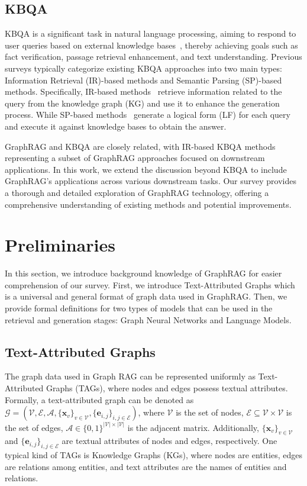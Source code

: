 \documentclass[acmsmall]{acmart}
\begin{document}
\subsection{KBQA}
KBQA is a significant task in natural language processing, aiming to respond to user queries based on external knowledge bases~\cite{ref:kbqasurvey1,ref:kbqasurvey2,ref:kbqasurvey3,ref:kbqasurvey4}, thereby achieving goals such as fact verification, passage retrieval enhancement, and text understanding. Previous surveys typically categorize existing KBQA approaches into two main types: Information Retrieval (IR)-based methods and Semantic Parsing (SP)-based methods. Specifically, IR-based methods~\cite{ref:rog,ref:tog,ref:tog2,ref:unikgqa,ref:sr,ref:rra,ref:kd-cot,ref:kg-agent} retrieve information related to the query from the knowledge graph (KG) and use it to enhance the generation process. While SP-based methods~\cite{ref:noname3,ref:dara,ref:retrack,ref:rng,ref:arcaneqa,ref:hsge} generate a logical form (LF) for each query and execute it against knowledge bases to obtain the answer.

GraphRAG and KBQA are closely related, with IR-based KBQA methods representing a subset of GraphRAG approaches focused on downstream applications. In this work, we extend the discussion beyond KBQA to include GraphRAG’s applications across various downstream tasks. Our survey provides a thorough and detailed exploration of GraphRAG technology, offering a comprehensive understanding of existing methods and potential improvements.

\section{Preliminaries}
\label{sec:formalization}
In this section, we introduce background knowledge of GraphRAG for easier comprehension of our survey. First, we introduce Text-Attributed Graphs which is a universal and general format of graph data used in GraphRAG. Then, we provide formal definitions for two types of models that can be used in the retrieval and generation stages: Graph Neural Networks and Language Models.

\subsection{Text-Attributed Graphs}
The graph data used in Graph RAG can be represented uniformly as Text-Attributed Graphs (TAGs), where nodes and edges possess textual attributes. Formally, a text-attributed graph can be denoted as $\mathcal{G} = (\mathcal{V}, \mathcal{E}, \mathcal{A}, \{\mathbf{x}_v\}_{v \in \mathcal{V}},\{\mathbf{e}_{i,j}\}_{i,j \in \mathcal{E}})$, where $\mathcal{V}$ is the set of nodes, $\mathcal{E} \subseteq \mathcal{V} \times \mathcal{V}$ is the set of edges, $\mathcal{A} \in \{0,1\}^{\lvert \mathcal{V} \rvert \times \lvert \mathcal{V} \rvert}$ is the adjacent matrix. Additionally, $\{\mathbf{x}_v\}_{v \in \mathcal{V}}$ and $\{\mathbf{e}_{i,j}\}_{i,j \in \mathcal{E}}$ are textual attributes of nodes and edges, respectively. One typical kind of TAGs is Knowledge Graphs (KGs), where nodes are entities, edges are relations among entities, and text attributes are the names of entities and relations.
\end{document}
